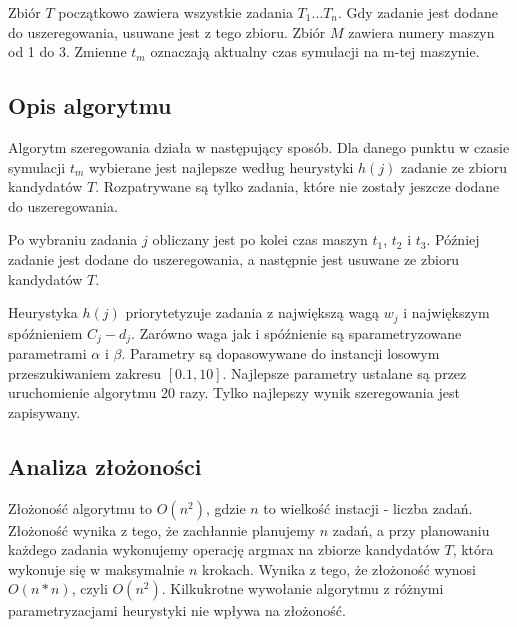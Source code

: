 \documentclass[11pt]{article}
\begin{document}
Zbiór $T$ początkowo zawiera wszystkie zadania $T_1 \dots T_n$. Gdy zadanie jest dodane do uszeregowania, usuwane jest z tego zbioru.
Zbiór $M$ zawiera numery maszyn od 1 do 3.
Zmienne $t_m$ oznaczają aktualny czas symulacji na m-tej maszynie.

\subsection{Opis algorytmu}

Algorytm szeregowania działa w następujący sposób. Dla danego punktu w czasie symulacji $t_m$ wybierane jest najlepsze według heurystyki $h(j)$ zadanie ze zbioru kandydatów $T$. Rozpatrywane są tylko zadania, które nie zostały jeszcze dodane do uszeregowania.

Po wybraniu zadania $j$ obliczany jest po kolei czas maszyn $t_1$, $t_2$ i $t_3$. Później zadanie jest dodane do uszeregowania, a następnie jest usuwane ze zbioru kandydatów $T$.

Heurystyka $h(j)$ priorytetyzuje zadania z największą wagą $w_j$ i największym spóźnieniem $C_j - d_j$. Zarówno waga jak i spóźnienie są sparametryzowane parametrami $\alpha$ i $\beta$. Parametry są dopasowywane do instancji losowym przeszukiwaniem zakresu $[0.1, 10]$. Najlepsze parametry ustalane są przez uruchomienie algorytmu 20 razy. Tylko najlepszy wynik szeregowania jest zapisywany.


\subsection{Analiza złożoności}

Złożoność algorytmu to $O(n^2)$, gdzie $n$ to wielkość instacji - liczba zadań. Złożoność wynika z tego, że zachłannie planujemy $n$ zadań, a przy planowaniu każdego zadania wykonujemy operację argmax na zbiorze kandydatów $T$, która wykonuje się w maksymalnie $n$ krokach. Wynika z tego, że złożoność wynosi $O(n*n)$, czyli $O(n^2)$. Kilkukrotne wywołanie algorytmu z różnymi parametryzacjami heurystyki nie wpływa na złożoność.
\end{document}
